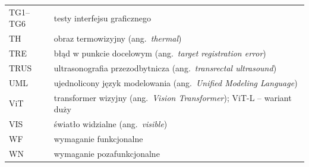 {\begin{longtable}{@{}p{2.6cm}p{12.2cm}@{}}
  TG1--TG6 & testy interfejsu graficznego \\
  TH & obraz termowizyjny (ang.~\textit{thermal}) \\
  TRE & błąd w punkcie docelowym (ang.~\textit{target registration error}) \\
  TRUS & ultrasonografia przezodbytnicza (ang.~\textit{transrectal ultrasound}) \\
  UML & ujednolicony język modelowania (ang.~\textit{Unified Modeling Language}) \\
  ViT & transformer wizyjny (ang.~\textit{Vision Transformer}); ViT-L -- wariant duży \\
  VIS & światło widzialne (ang.~\textit{visible}) \\
  WF & wymaganie funkcjonalne \\
  WN & wymaganie pozafunkcjonalne \\
\end{longtable}
}
